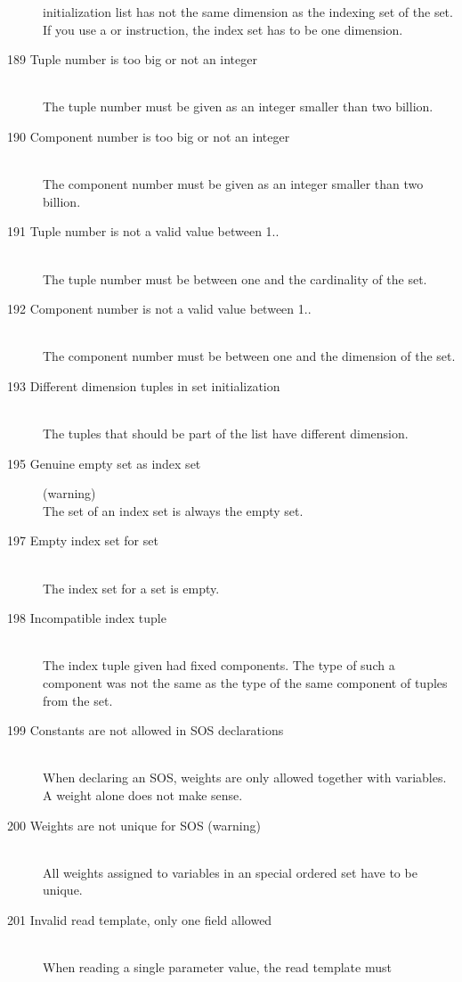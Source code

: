 \begin{description}
   initialization list has
   not the same dimension as the indexing set of the set. 
   If you use a  or  instruction, the index
   set has to be one dimension.
\item[189 Tuple number \code{xxx} is too big or not an integer]\ \\
  The tuple number must be given as an integer smaller than two
  billion.
\item[190 Component number \code{xxx} is too big or not an integer]\ \\
  The component number must be given as an integer smaller than two
  billion.
\item[191 Tuple number \code{xxx} is not a valid value between 1..\code{yyy}]\ \\
  The tuple number must be between one and the cardinality of the set.
\item[192 Component number \code{xxx} is not a valid value between 1..\code{yyy}]\ \\
  The component number must be between one and the dimension of the set.
\item[193 Different dimension tuples in set initialization]\ \\
  The tuples that should be part of the list have different dimension.
\item[195 Genuine empty set as index set] (warning)\ \\
  The set of an index set is always the empty set.
\item[197 Empty index set for set]\ \\
  The index set for a set is empty.
\item[198 Incompatible index tuple]\ \\
  The index tuple given had fixed components. The type of such a
  component was not the same as the type of the same component of tuples
  from the set.
\item[199 Constants are not allowed in SOS declarations]\ \\
  When declaring an SOS, weights are only allowed together with
  variables. A weight alone does not make sense.
\item[200 Weights are not unique for SOS \code{xxx} (warning)]\ \\
  All weights assigned to variables in an special ordered set have to
  be unique. 
\item[201 Invalid read template, only one field allowed]\ \\
  When reading a single parameter value, the read template must

\end{description}

